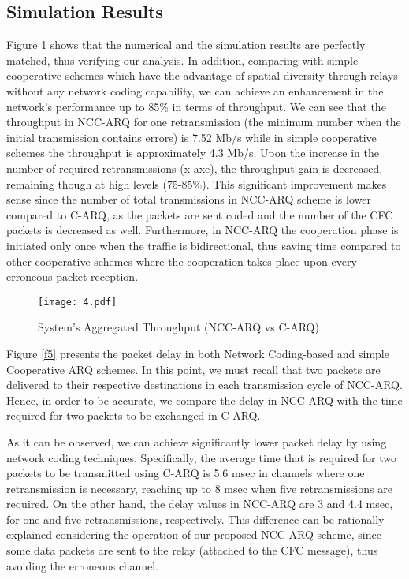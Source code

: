 \documentclass[conference]{IEEEtran}
\begin{document}
\subsection{Simulation Results}

Figure \ref{f4} shows that the numerical and the simulation results are perfectly matched, thus verifying our analysis. In addition, comparing with simple cooperative schemes which have the advantage of spatial diversity through relays without any network coding capability, we can achieve an enhancement in the network's performance up to 85\% in terms of throughput. We can see that the throughput in NCC-ARQ for one retransmission (the minimum number when the initial transmission contains errors) is 7.52 Mb/s while in simple cooperative schemes the throughput is approximately 4.3 Mb/s. Upon the increase in the number of required retransmissions (x-axe), the throughput gain is decreased, remaining though at high levels (75-85\%). This significant improvement makes sense since the number of total transmissions in NCC-ARQ scheme is lower compared to C-ARQ, as the packets are sent coded and the number of the CFC packets is decreased as well. Furthermore, in NCC-ARQ the cooperation phase is initiated only once when the traffic is bidirectional, thus saving time compared to other cooperative schemes where the cooperation takes place upon every erroneous packet reception.

\begin{figure}[htb]
\centering
\texttt{[image: 4.pdf]}
\caption{System's Aggregated Throughput (NCC-ARQ vs C-ARQ)}\label{f4}
\end{figure}

Figure \ref{f5} presents the packet delay in both Network Coding-based and simple Cooperative ARQ schemes. In this point, we must recall that two packets are delivered to their respective destinations in each transmission cycle of NCC-ARQ. Hence, in order to be accurate, we compare the delay in NCC-ARQ with the time required for two packets to be exchanged in C-ARQ.

As it can be observed, we can achieve significantly lower packet delay by using network coding techniques. Specifically, the average time that is required for two packets to be transmitted using C-ARQ is 5.6 msec in channels where one retransmission is necessary, reaching up to 8 msec when five retransmissions are required. On the other hand, the delay values in NCC-ARQ are 3 and 4.4 msec, for one and five retransmissions, respectively. This difference can be rationally explained considering the operation of our proposed NCC-ARQ scheme, since some data packets are sent to the relay (attached to the CFC message), thus avoiding the erroneous channel.
\end{document}
